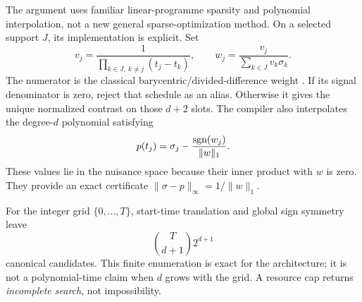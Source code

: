 \documentclass[11pt,letterpaper]{article}
\newcommand{\norm}[1]{\lVert#1\rVert}
\theoremstyle{definition}\newtheorem{definition}[theorem]{Definition}
\theoremstyle{remark}\newtheorem{remark}[theorem]{Remark}
\begin{document}
The argument uses familiar linear-programme sparsity and polynomial interpolation, not a new general sparse-optimization method. On a selected support $J$, its implementation is explicit. Set
\begin{equation}
 v_j=\frac1{\prod_{k\in J,\ k\ne j}(t_j-t_k)},\qquad
 w_j=\frac{v_j}{\sum_{k\in J}v_k\sigma_k}.
 \label{eq:barycentric}
\end{equation}
The numerator is the classical barycentric/divided-difference weight \cite{berrut}. If its signal denominator is zero, reject that schedule as an alias. Otherwise it gives the unique normalized contrast on those $d+2$ slots. The compiler also interpolates the degree-$d$ polynomial satisfying
\begin{equation}
 p(t_j)=\sigma_j-\frac{\sgn(w_j)}{\norm{w}_1}.
 \label{eq:dualpoly}
\end{equation}
These values lie in the nuisance space because their inner product with $w$ is zero. They provide an exact certificate $\norm{\sigma-p}_\infty=1/\norm{w}_1$.

For the integer grid $\{0,\ldots,T\}$, start-time translation and global sign symmetry leave
\begin{equation}
 \binom{T}{d+1}2^{d+1}
 \label{eq:count}
\end{equation}
canonical candidates. This finite enumeration is exact for the architecture; it is not a polynomial-time claim when $d$ grows with the grid. A resource cap returns \emph{incomplete search}, not impossibility.
\end{document}
